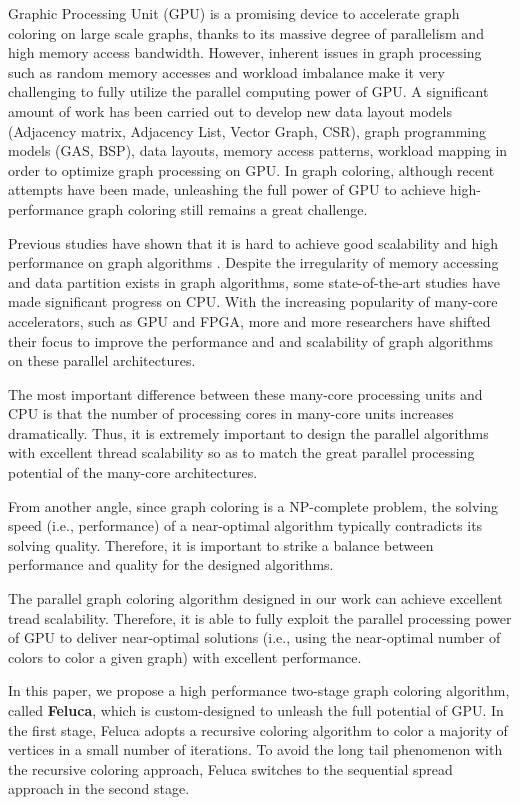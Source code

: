 Graphic Processing Unit (GPU) is a promising device to accelerate graph coloring on large scale graphs, thanks to its massive degree of parallelism and high memory access bandwidth. However, inherent issues in graph processing such as random memory accesses and workload imbalance make it very challenging to fully utilize the parallel computing power of GPU. A significant amount of work has been carried out to develop new data layout models (Adjacency matrix, Adjacency List, Vector Graph, CSR), graph programming models (GAS, BSP), data layouts, memory access patterns, workload mapping in order to optimize graph processing on GPU. In graph coloring, although recent attempts \cite{Manycore,ppopp-11} have been made, unleashing the full power of GPU to achieve high-performance graph coloring still remains a great challenge.

Previous studies have shown that it is hard to achieve good scalability and high performance on graph algorithms \cite{csur18}. %
Despite the irregularity of memory accessing and data partition exists in graph algorithms, some state-of-the-art studies have made significant progress on CPU. With the increasing popularity of many-core accelerators, such as GPU and FPGA, more and more researchers have shifted their focus to improve the performance and and scalability of graph algorithms on these parallel architectures. 

The most important difference between these many-core processing units and CPU is that the number of processing cores in many-core units increases dramatically.  Thus, it is extremely important to design the parallel algorithms with excellent thread scalability so as to match the great parallel processing potential of the many-core architectures.  

From another angle, since graph coloring is a NP-complete problem, the solving speed (i.e., performance) of a near-optimal algorithm typically contradicts its solving quality. Therefore, it is important to strike a balance between performance and quality for the designed algorithms. 

The parallel graph coloring algorithm designed in our work can achieve excellent tread scalability. Therefore, it is able to fully exploit the parallel processing power of GPU to deliver near-optimal solutions (i.e., using the near-optimal number of colors to color a given graph) with excellent performance.  

In this paper, we propose a high performance two-stage graph coloring algorithm, called \textbf{Feluca}, which is custom-designed to unleash the full potential of GPU. In the first stage, Feluca adopts a recursive coloring algorithm to color a majority of vertices in a small number of iterations. To avoid the long tail phenomenon with the recursive coloring approach, Feluca switches to the sequential spread approach in the second stage. %

